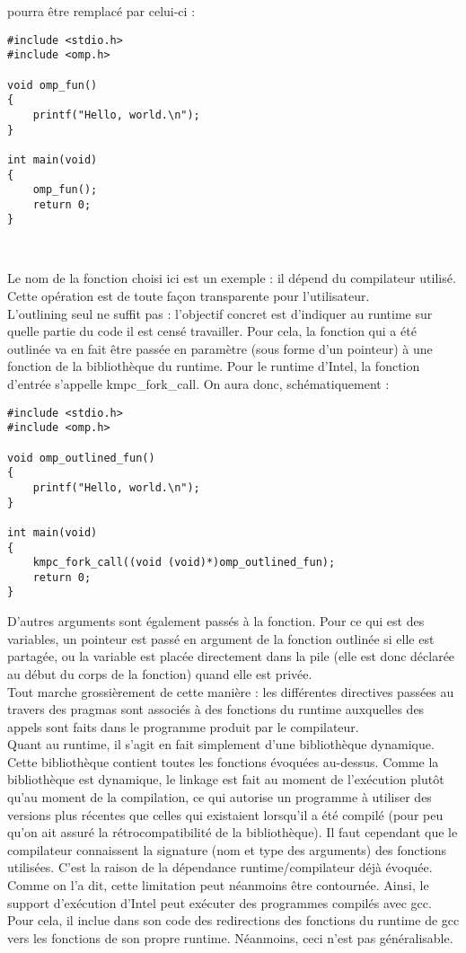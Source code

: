 \documentclass{report}
\begin{document}
pourra être remplacé par celui-ci :
\begin{lstlisting}
#include <stdio.h>
#include <omp.h>

void omp_fun()
{
    printf("Hello, world.\n");
}

int main(void)
{
    omp_fun();
    return 0;
}



\end{lstlisting}
Le nom de la fonction choisi ici est un exemple : il dépend du compilateur utilisé. Cette opération est
de toute façon transparente pour l'utilisateur. 
\\L'outlining seul ne suffit pas : l'objectif concret est d'indiquer au runtime sur quelle partie du code
il est censé travailler. Pour cela, la fonction qui a été outlinée va en fait être passée en paramètre
(sous forme d'un pointeur) à une fonction de la bibliothèque du runtime. Pour le runtime d'Intel, la 
fonction d'entrée s'appelle kmpc\_fork\_call. On aura donc, schématiquement : 

\begin{lstlisting}
#include <stdio.h>
#include <omp.h>

void omp_outlined_fun()
{
    printf("Hello, world.\n");
}

int main(void)
{
    kmpc_fork_call((void (void)*)omp_outlined_fun);
    return 0;
}

\end{lstlisting}

D'autres arguments sont également passés à la fonction. Pour ce qui est des variables, un pointeur est
passé en argument de la fonction outlinée si elle est partagée, ou la variable est placée directement
dans la pile (elle est donc déclarée au début du corps de la fonction) quand elle est privée.
\\Tout marche grossièrement de cette manière : les différentes directives passées au travers des pragmas
sont associés à des fonctions du runtime auxquelles des appels sont faits dans le programme produit par
le compilateur. 
\\Quant au runtime, il s'agit en fait simplement d'une bibliothèque dynamique. Cette bibliothèque 
contient toutes les fonctions évoquées au-dessus. Comme la bibliothèque est dynamique, le linkage est fait
au moment de l'exécution plutôt qu'au moment de la compilation, ce qui autorise un programme à utiliser
des versions plus récentes que celles qui existaient lorsqu'il a été compilé (pour peu qu'on ait assuré
la rétrocompatibilité de la bibliothèque). Il faut cependant que le compilateur connaissent la signature
(nom et type des arguments) des fonctions utilisées. C'est la raison de la dépendance runtime/compilateur
déjà évoquée. Comme on l'a dit, cette limitation peut néanmoins être contournée. Ainsi, le support 
d'exécution d'Intel peut exécuter des programmes compilés avec gcc. Pour cela, il inclue dans son code
des redirections des fonctions du runtime de gcc vers les fonctions de son propre runtime. Néanmoins,
ceci n'est pas généralisable.
\end{document}
